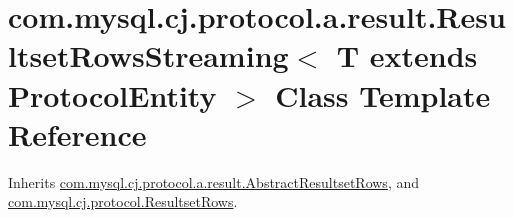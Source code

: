 \hypertarget{classcom_1_1mysql_1_1cj_1_1protocol_1_1a_1_1result_1_1_resultset_rows_streaming}{}\section{com.\+mysql.\+cj.\+protocol.\+a.\+result.\+Resultset\+Rows\+Streaming$<$ T extends Protocol\+Entity $>$ Class Template Reference}
\label{classcom_1_1mysql_1_1cj_1_1protocol_1_1a_1_1result_1_1_resultset_rows_streaming}


Inherits \mbox{\hyperlink{classcom_1_1mysql_1_1cj_1_1protocol_1_1a_1_1result_1_1_abstract_resultset_rows}{com.\+mysql.\+cj.\+protocol.\+a.\+result.\+Abstract\+Resultset\+Rows}}, and \mbox{\hyperlink{interfacecom_1_1mysql_1_1cj_1_1protocol_1_1_resultset_rows}{com.\+mysql.\+cj.\+protocol.\+Resultset\+Rows}}.

